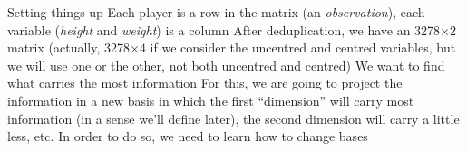 \documentclass[aspectratio=169]{beamer}\usepackage[]{graphicx}\usepackage[]{xcolor}
\makeatletter
\newcommand{\hlopt}[1]{\textcolor[rgb]{0,0,0}{#1}}%
\newcommand{\hldef}[1]{\textcolor[rgb]{0.345,0.345,0.345}{#1}}%
\newcommand{\hlkwb}[1]{\textcolor[rgb]{0.69,0.353,0.396}{#1}}%
\newcommand{\hlkwd}[1]{\textcolor[rgb]{0.737,0.353,0.396}{\textbf{#1}}}%
\newenvironment{kframe}{%
 \def\at@end@of@kframe{}%
 \ifinner\ifhmode%
  \def\at@end@of@kframe{\end{minipage}}%
  \begin{minipage}{\columnwidth}%
 \fi\fi%
 \def\FrameCommand##1{\hskip\@totalleftmargin \hskip-\fboxsep
 \colorbox{shadecolor}{##1}\hskip-\fboxsep
     \hskip-\linewidth \hskip-\@totalleftmargin \hskip\columnwidth}%
 \MakeFramed {\advance\hsize-\width
   \@totalleftmargin\z@ \linewidth\hsize
   \@setminipage}}%
 {\par\unskip\endMakeFramed%
 \at@end@of@kframe}
\newenvironment{knitrout}{}{} %
\makeatother
\begin{document}





\begin{frame}{Setting things up}
Each player is a row in the matrix (an \emph{observation}), each variable (\emph{height} and \emph{weight}) is a column
\vfill
After deduplication, we have an 3278$\times 2$ matrix (actually, 3278$\times 4$ if we consider the uncentred and centred variables, but we will use one or the other, not both uncentred and centred)
\vfill
We want to find what carries the most information
\vfill
For this, we are going to project the information in a new basis in which the first ``dimension'' will carry most information (in a sense we'll define later), the second dimension will carry a little less, etc.
\vfill
In order to do so, we need to learn how to change bases
\end{frame}

\end{document}
